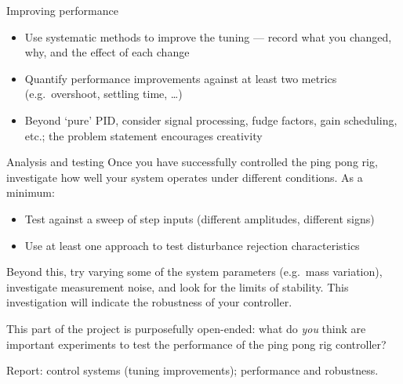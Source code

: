 \documentclass[9pt]{beamer-control}
\begin{document}

\begin{frame}{Improving performance}
\begin{itemize}
\item Use systematic methods to improve the tuning --- record what you changed, why, and the effect of each change
\item Quantify performance improvements against at least two metrics (e.g.\ overshoot, settling time, \dots)
\item Beyond `pure' PID, consider signal processing, fudge factors, gain scheduling, etc.; the problem statement encourages creativity
\end{itemize}
\end{frame}


\begin{frame}{Analysis and testing}
Once you have successfully controlled the ping pong rig, investigate how well your system operates under different conditions. As a minimum:
\begin{itemize}
\item Test against a sweep of step inputs (different amplitudes, different signs)
\item Use at least one approach to test disturbance rejection characteristics
\end{itemize}
Beyond this, try varying some of the system parameters (e.g.\ mass variation), investigate measurement noise, and look for the limits of stability. This investigation will indicate the robustness of your controller.

This part of the project is purposefully open-ended: what do \emph{you} think are important experiments to test the performance of the ping pong rig controller?

\alert{Report:} control systems (tuning improvements); performance and robustness.
\end{frame}


\end{document}
